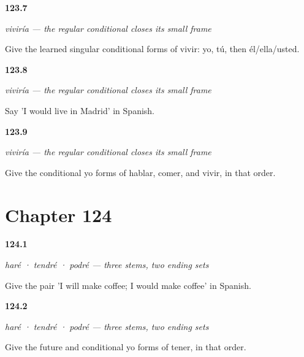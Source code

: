 \noindent\begin{minipage}[t]{\linewidth}
\raggedright
\hypertarget{review-ES-C17-vivir-condicional-singular-forms}{\textbf{123.7}} \emph{viviría — the regular conditional closes its small frame}\par
\small Give the learned singular conditional forms of vivir: yo, tú, then él/ella/usted.
\end{minipage}\par\medskip

\noindent\begin{minipage}[t]{\linewidth}
\raggedright
\hypertarget{review-ES-C17-vivir-condicional-madrid}{\textbf{123.8}} \emph{viviría — the regular conditional closes its small frame}\par
\small Say 'I would live in Madrid' in Spanish.
\end{minipage}\par\medskip

\noindent\begin{minipage}[t]{\linewidth}
\raggedright
\hypertarget{review-ES-C17-vivir-condicional-three-yo}{\textbf{123.9}} \emph{viviría — the regular conditional closes its small frame}\par
\small Give the conditional yo forms of hablar, comer, and vivir, in that order.
\end{minipage}\par\medskip

\section*{Chapter 124}

\noindent\begin{minipage}[t]{\linewidth}
\raggedright
\hypertarget{review-ES-C17-irregulares-hacer-pair}{\textbf{124.1}} \emph{haré · tendré · podré — three stems, two ending sets}\par
\small Give the pair 'I will make coffee; I would make coffee' in Spanish.
\end{minipage}\par\medskip

\noindent\begin{minipage}[t]{\linewidth}
\raggedright
\hypertarget{review-ES-C17-irregulares-tener-pair}{\textbf{124.2}} \emph{haré · tendré · podré — three stems, two ending sets}\par
\small Give the future and conditional yo forms of tener, in that order.
\end{minipage}\par\medskip

